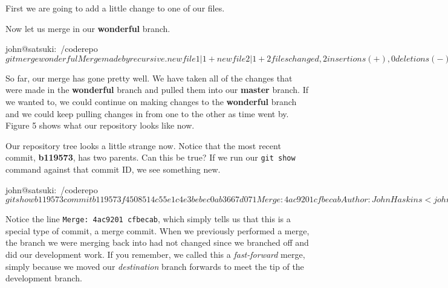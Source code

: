 First we are going to add a little change to one of our files.


Now let us merge in our \textbf{wonderful} branch.

\begin{code}
john@satsuki:~/coderepo$ git merge wonderful
Merge made by recursive.
 newfile1 |    1 +
 newfile2 |    1 +
 2 files changed, 2 insertions(+), 0 deletions(-)
john@satsuki:~/coderepo$
\end{code}

So far, our merge has gone pretty well.
We have taken all of the changes that were made in the \textbf{wonderful} branch and pulled them into our \textbf{master} branch.
If we wanted to, we could continue on making changes to the \textbf{wonderful} branch and we could keep pulling changes in from one to the other as time went by.
Figure 5 shows what our repository looks like now.


Our repository tree looks a little strange now.
Notice that the most recent commit, \textbf{b119573}, has two parents.
Can this be true? If we run our \texttt{git show} command against that commit ID, we see something new.

\begin{code}
john@satsuki:~/coderepo$ git show b119573
commit b119573f4508514c55e1c4e3bebec0ab3667d071
Merge: 4ac9201 cfbecab
Author: John Haskins <john.haskins@tamagoyakiinc.koala>
Date:   Fri Apr 1 07:35:13 2011 +0100

    Merge branch 'wonderful'

john@satsuki:~/coderepo$
\end{code}

Notice the line \texttt{Merge: 4ac9201 cfbecab}, which simply tells us that this is a special type of commit, a merge commit.
When we previously performed a merge, the branch we were merging back into had not changed since we branched off and did our development work.
If you remember, we called this a \emph{fast-forward} merge, simply because we moved our \emph{destination} branch forwards to meet the tip of the development branch.

